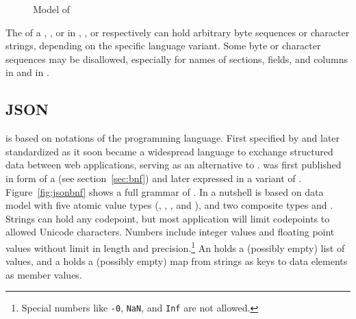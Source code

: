 %
\begin{figure}
\centering
{}
\caption{Model of }
\label{fig:sexpmodel}
\end{figure}

The  of a , , or  in 
, , or  respectively can hold arbitrary 
byte sequences or character strings, depending on the specific language variant. 
Some byte or character sequences may be disallowed, especially for names of 
sections, fields, and columns in  and in .


\subsection{JSON}
\label{sec:json}

 is based on notations of the
 programming language. First specified by
\textcite{Crockford2002} and later standardized as  \cite{RFC4627} it
soon became a widespread language to exchange structured data between web
applications, serving as an alternative to .  was first
published in form of a  (see section~\ref{sec:bnf}) and
later expressed in a variant of .
Figure~\ref{fig:jsonbnf} shows a full  grammar of . In
a nutshell  is based on data model with five atomic value types
(, , , and ), and
two composite types  and . Strings can hold any
 codepoint, but most application will limit codepoints to allowed
Unicode characters.  Numbers include integer values and floating point values
without limit in length and precision.\footnote{Special numbers like
\texttt{-0}, \texttt{NaN}, and \texttt{Inf} are not allowed.} An 
holds a (possibly empty) list of values, and a  holds a
(possibly empty) map from strings as keys to data elements as member values.

